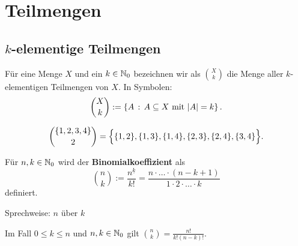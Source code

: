 \section{Teilmengen} 

\subsection{$k$-elementige Teilmengen} 

\begin{defn}
Für eine Menge $X$ und ein $k \in \mathbb{N}_0$ bezeichnen wir als $\binom{X}{k}$ die Menge aller $k$-elementigen Teilmengen von $X$. In Symbolen:
\[
\binom{X}{k} := \left\{ A \,:\, A \subseteq X \text{ mit } |A| = k \right\}.
\]
\end{defn}

\begin{bsp}
	\[
	\binom{\{1,2,3,4\}}{2} = \Bigl\{ \{1,2\},\{1,3\}, \{1,4\}, \{2,3\}, \{2,4\} ,\{3,4\} \Bigr\}.
	\]
\end{bsp} 


\begin{defn}
	Für $n,k \in \mathbb{N}_0$ wird der \textbf{Binomialkoeffizient} als 
	\[
		\binom{n}{k}:= \frac{n^{\underline{k}}}{k!}  = \frac{n \cdot \ldots \cdot (n-k+1)}{1\cdot 2 \cdot \ldots \cdot k}
	\]
	definiert.
	
	Sprechweise: \glqq $n$ über $k$\grqq
\end{defn} 

\begin{bem}
	Im Fall $0 \le k \le n$ und $n,k \in \mathbb{N}_0$ gilt $\binom{n}{k} = \frac{n!}{k! (n-k)!}$. 
\end{bem} 


